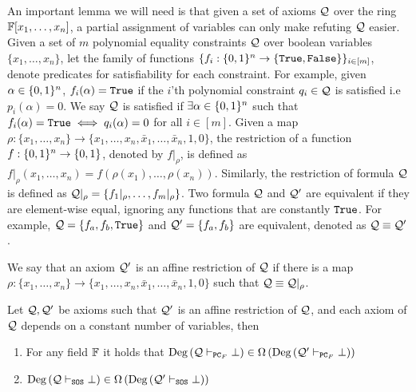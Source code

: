 \documentclass[11pt]{article}
\begin{document}
An important lemma we will need is that given a set of axioms $\mathcal{Q}$ over the ring $\mathbb{F}[x_1, \dots, x_n]$, a partial assignment of variables can only make refuting $\mathcal{Q}$ easier.
Given a set of $m$ polynomial equality constraints $\mathcal{Q}$ over boolean variables $\{x_1, \dots, x_n\}$, let the family of functions $\{f_i: \{0,1\}^n \rightarrow \{\texttt{True},\texttt{False}\} \}_{i \in [m]}$, denote predicates for satisfiability for each constraint.
For example, given $\alpha \in \{0,1\}^n$, $f_i(\alpha) = \texttt{True}$ if the $i$'th polynomial constraint $q_i \in \mathcal{Q}$ is satisfied i.e $p_i(\alpha) = 0$.
We say $\mathcal{Q}$ is satisfied if $\exists \alpha \in \{0,1\}^n$ such that $f_i(\alpha) = \texttt{True} \iff q_i(\alpha)=0$ for all $i \in [m]$.
Given a map $\rho: \{x_1, \dots, x_n \} \rightarrow \{x_1, \dots, x_n, \bar{x}_1, \dots, \bar{x}_n, 1, 0 \}$, the restriction of a function $f: \{0,1\}^n \rightarrow \{0,1\}$, denoted by $f|_\rho$, is defined as $f|_\rho(x_1, \dots, x_n) = f(\rho(x_1), \dots, \rho(x_n))$.
Similarly, the restriction of formula $\mathcal{Q}$ is defined as $\mathcal{Q}|_\rho = \{f_{1}|_\rho, \dots, f_{m}|_\rho \}$.
Two formula $\mathcal{Q}$ and $\mathcal{Q}'$ are equivalent if they are element-wise equal, ignoring any functions that are constantly $\texttt{True}$.
For example, $\mathcal{Q} = \{f_a, f_b, \texttt{True} \}$ and $\mathcal{Q}' = \{f_a, f_b\}$ are equivalent, denoted as $\mathcal{Q} \equiv \mathcal{Q}'$.


\begin{definition}\label{def:affine-restriction}
We say that an axiom $\mathcal{Q}'$ is an
affine restriction of $\mathcal{Q}$ if there is a map $\rho : \{x_1,\dots,x_n\} \rightarrow \{x_1, \dots, x_n, \bar{x}_1, \dots, \bar{x}_n, 1, 0 \}$ such that $\mathcal{Q} \equiv \mathcal{Q}|_{\rho}$.	
\end{definition}


\begin{lemma}\label{lemma:affine_restriction}
Let $\mathcal{Q}, \mathcal{Q}'$ be axioms such that $\mathcal{Q}'$ is an affine restriction of $\mathcal{Q}$, and each axiom
of $\mathcal{Q}$ depends on a constant number of variables, then 
\begin{enumerate}
	\item For any field $\mathbb{F}$ it holds that $\text{Deg}\left(\mathcal{Q} \vdash_{\texttt{PC}_F} \bot\right) \in \Omega\left(\text{Deg}\left(\mathcal{Q}' \vdash_{\texttt{PC}_F} \bot\right)\right)$
	\item $\text{Deg}\left(\mathcal{Q} \vdash_{\texttt{SOS}} \bot\right) \in \Omega\left(\text{Deg}\left(\mathcal{Q}' \vdash_{\texttt{SOS}} \bot\right)\right)$
\end{enumerate}
\end{lemma}
\end{document}

